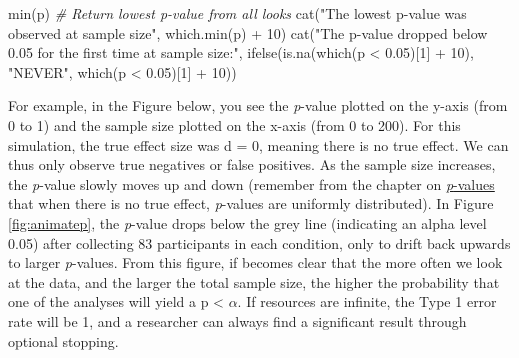 \documentclass[
  oneside]{book}
\newenvironment{Shaded}{\begin{snugshade}}{\end{snugshade}}
\newcommand{\CommentTok}[1]{\textcolor[rgb]{0.56,0.35,0.01}{\textit{#1}}}
\newcommand{\DecValTok}[1]{\textcolor[rgb]{0.00,0.00,0.81}{#1}}
\newcommand{\FloatTok}[1]{\textcolor[rgb]{0.00,0.00,0.81}{#1}}
\newcommand{\FunctionTok}[1]{\textcolor[rgb]{0.00,0.00,0.00}{#1}}
\newcommand{\NormalTok}[1]{#1}
\newcommand{\SpecialCharTok}[1]{\textcolor[rgb]{0.00,0.00,0.00}{#1}}
\newcommand{\StringTok}[1]{\textcolor[rgb]{0.31,0.60,0.02}{#1}}
\begin{document}
\begin{Shaded}
\begin{Highlighting}[]
\FunctionTok{min}\NormalTok{(p) }\CommentTok{\# Return lowest p{-}value from all looks}
\FunctionTok{cat}\NormalTok{(}\StringTok{"The lowest p{-}value was observed at sample size"}\NormalTok{, }\FunctionTok{which.min}\NormalTok{(p) }\SpecialCharTok{+} \DecValTok{10}\NormalTok{) }
\FunctionTok{cat}\NormalTok{(}\StringTok{"The p{-}value dropped below 0.05 for the first time at sample size:"}\NormalTok{, }
    \FunctionTok{ifelse}\NormalTok{(}\FunctionTok{is.na}\NormalTok{(}\FunctionTok{which}\NormalTok{(p }\SpecialCharTok{\textless{}} \FloatTok{0.05}\NormalTok{)[}\DecValTok{1}\NormalTok{] }\SpecialCharTok{+} \DecValTok{10}\NormalTok{), }\StringTok{"NEVER"}\NormalTok{, }\FunctionTok{which}\NormalTok{(p }\SpecialCharTok{\textless{}} \FloatTok{0.05}\NormalTok{)[}\DecValTok{1}\NormalTok{] }\SpecialCharTok{+} \DecValTok{10}\NormalTok{)) }
\end{Highlighting}
\end{Shaded}

For example, in the Figure below, you see the \emph{p}-value plotted on the y-axis (from 0 to 1) and the sample size plotted on the x-axis (from 0 to 200). For this simulation, the true effect size was d = 0, meaning there is no true effect. We can thus only observe true negatives or false positives. As the sample size increases, the \emph{p}-value slowly moves up and down (remember from the chapter on \protect\hyperlink{pvalues}{\emph{p}-values} that when there is no true effect, \emph{p}-values are uniformly distributed). In Figure \ref{fig:animatep}, the \emph{p}-value drops below the grey line (indicating an alpha level 0.05) after collecting 83 participants in each condition, only to drift back upwards to larger \emph{p}-values. From this figure, if becomes clear that the more often we look at the data, and the larger the total sample size, the higher the probability that one of the analyses will yield a p \textless{} \(\alpha\). If resources are infinite, the Type 1 error rate will be 1, and a researcher can always find a significant result through optional stopping.
\end{document}
